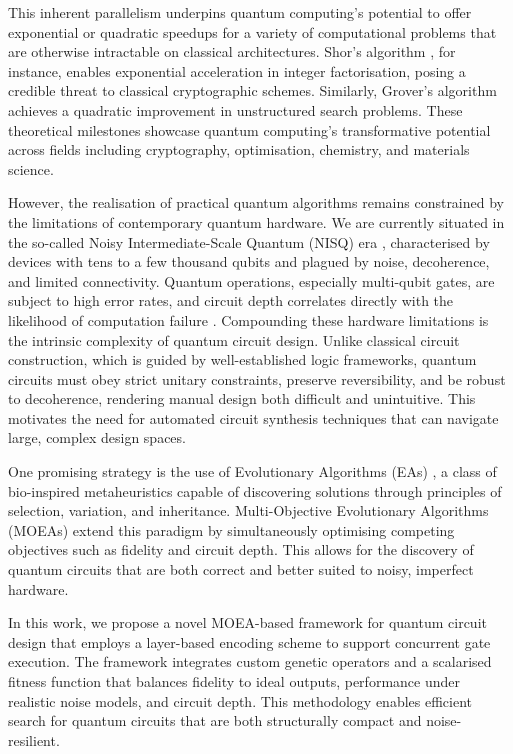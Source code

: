 \documentclass[11pt,a4paper]{article}
\begin{document}
This inherent parallelism underpins quantum computing’s potential to offer exponential or quadratic speedups for a variety of computational problems that are otherwise intractable on classical architectures. Shor’s algorithm \cite{Shor365700}, for instance, enables exponential acceleration in integer factorisation, posing a credible threat to classical cryptographic schemes. Similarly, Grover’s algorithm \cite{Khanal2021QuantumML} achieves a quadratic improvement in unstructured search problems. These theoretical milestones showcase quantum computing’s transformative potential across fields including cryptography, optimisation, chemistry, and materials science.\newline

However, the realisation of practical quantum algorithms remains constrained by the limitations of contemporary quantum hardware. We are currently situated in the so-called Noisy Intermediate-Scale Quantum (NISQ) era \cite{Preskill2018QuantumCI}, characterised by devices with tens to a few thousand qubits and plagued by noise, decoherence, and limited connectivity. Quantum operations, especially multi-qubit gates, are subject to high error rates, and circuit depth correlates directly with the likelihood of computation failure \cite{Clerk2008IntroductionTQ}. Compounding these hardware limitations is the intrinsic complexity of quantum circuit design. Unlike classical circuit construction, which is guided by well-established logic frameworks, quantum circuits must obey strict unitary constraints, preserve reversibility, and be robust to decoherence, rendering manual design both difficult and unintuitive. This motivates the need for automated circuit synthesis techniques that can navigate large, complex design spaces.\newline

One promising strategy is the use of Evolutionary Algorithms (EAs) \cite{Lukac2002EvolvingQC}, a class of bio-inspired metaheuristics capable of discovering solutions through principles of selection, variation, and inheritance. Multi-Objective Evolutionary Algorithms (MOEAs) \cite{moein} extend this paradigm by simultaneously optimising competing objectives such as fidelity and circuit depth. This allows for the discovery of quantum circuits that are both correct and better suited to noisy, imperfect hardware.\newline

In this work, we propose a novel MOEA-based framework for quantum circuit design that employs a layer-based encoding scheme to support concurrent gate execution. The framework integrates custom genetic operators and a scalarised fitness function that balances fidelity to ideal outputs, performance under realistic noise models, and circuit depth. This methodology enables efficient search for quantum circuits that are both structurally compact and noise-resilient.\newline
\end{document}

